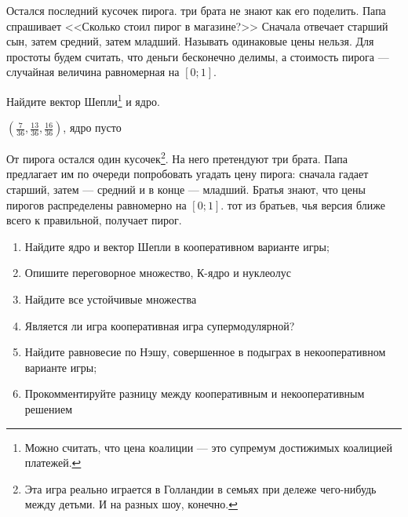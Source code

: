 \begin{problem}[Toetjes.]
\begin{source}
\cite{ferguson:tn}
\end{source}
Остался последний кусочек пирога. три брата не знают как его поделить. Папа спрашивает <<Сколько стоил пирог в магазине?>> Сначала отвечает старший сын, затем средний, затем младший. Называть одинаковые цены нельзя. Для простоты будем считать, что деньги бесконечно делимы, а стоимость пирога --- случайная величина равномерная на $[0;1]$.

Найдите вектор Шепли\footnote{Можно считать, что цена коалиции --- это супремум достижимых коалицией платежей.} и ядро.

\begin{sol}
$\left(\frac{7}{36},\frac{13}{36},\frac{16}{36}\right)$, ядро пусто
\end{sol}
\end{problem}



\begin{problem}


От пирога остался один кусочек\footnote{Эта игра реально играется в Голландии в семьях при дележе чего-нибудь между детьми. И на разных шоу, конечно.}. На него претендуют три брата. Папа предлагает им по очереди попробовать угадать цену пирога: сначала гадает старший, затем --- средний и в конце --- младший. Братья знают, что цены пирогов распределены равномерно на $[0;1]$. тот из братьев, чья версия ближе всего к правильной, получает пирог.
\begin{enumerate}
\item Найдите ядро и вектор Шепли в кооперативном варианте игры;

\item Опишите переговорное множество, К-ядро и нуклеолус
\item Найдите все устойчивые множества


\item Является ли игра кооперативная игра супермодулярной?

\item Найдите равновесие по Нэшу, совершенное в подыграх в некооперативном варианте игры;

\item Прокомментируйте разницу между кооперативным и некооперативным решением
\end{enumerate}



\begin{sol}

\end{sol}
\end{problem}




